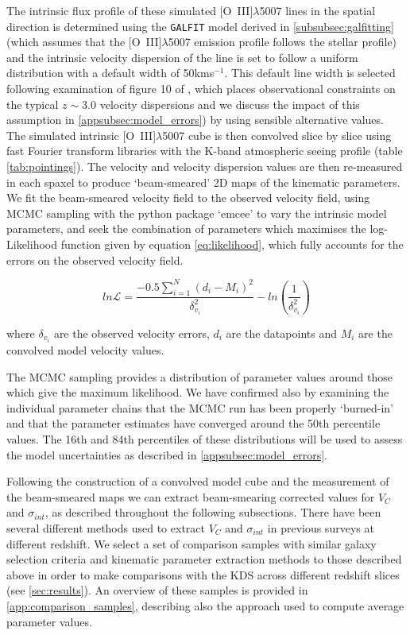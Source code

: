 \documentclass[fleqn,usenatbib]{mn2e}
\newcommand{\Lagr}{\mathcal{L}}
\begin{document}
The intrinsic flux profile of these simulated [O~{\sc III}]$\lambda$5007 lines in the spatial direction is determined using the {\tt GALFIT} model derived in \cref{subsubsec:galfitting} (which assumes that the [O~{\sc III}]$\lambda$5007 emission profile follows the stellar profile) and the intrinsic velocity dispersion of the line is set to follow a uniform distribution with a default width of 50kms$^{-1}$.
This default line width is selected following examination of figure 10 of \cite{Wisnioski2015}, which places observational constraints on the typical $z\sim3.0$ velocity dispersions and we discuss the impact of this assumption in \cref{appsubsec:model_errors}) by using sensible alternative values. \\

The simulated intrinsic [O~{\sc III}]$\lambda$5007 cube is then convolved slice by slice using fast Fourier transform libraries with the K-band atmospheric seeing profile (table \ref{tab:pointings}).
The velocity and velocity dispersion values are then re-measured in each spaxel to produce `beam-smeared' 2D maps of the kinematic parameters.
We fit the beam-smeared velocity field to the observed velocity field, using MCMC sampling with the python package `emcee' \citep{Foreman-Mackey2013} to vary the intrinsic model parameters, and seek the combination of parameters which maximises the log-Likelihood function given by equation \ref{eq:likelihood}, which fully accounts for the errors on the observed velocity field.

\begin{equation}\label{eq:likelihood}
   ln\Lagr = \frac{-0.5\sum_{i=1}^{N}(d_{i} - M_{i})^{2}}{\delta_{v_{i}}^{2}} - ln\left(\frac{1}{\delta_{v_{i}}^{2}}\right)
\end{equation}

\noindent
where $\delta_{v_{i}}$ are the observed velocity errors, $d_{i}$ are the datapoints and $M_{i}$ are the convolved model velocity values.

The MCMC sampling provides a distribution of parameter values around those which give the maximum likelihood.
We have confirmed also by examining the individual parameter chains that the MCMC run has been properly `burned-in' and that the parameter estimates have converged around the 50th percentile values.
The 16th and 84th percentiles of these distributions will be used to assess the model uncertainties as described in \cref{appsubsec:model_errors}.

Following the construction of a convolved model cube and the measurement of the beam-smeared maps we can extract beam-smearing corrected values for $V_{C}$ and $\sigma_{int}$, as described throughout the following subsections.
There have been several different methods used to extract $V_{C}$ and $\sigma_{int}$ in previous surveys at different redshift.
We select a set of comparison samples with similar galaxy selection criteria and kinematic parameter extraction methods to those described above in order to make comparisons with the KDS across different redshift slices (see \cref{sec:results}).
An overview of these samples is provided in \cref{app:comparison_samples}, describing also the approach used to compute average parameter values.
\end{document}

